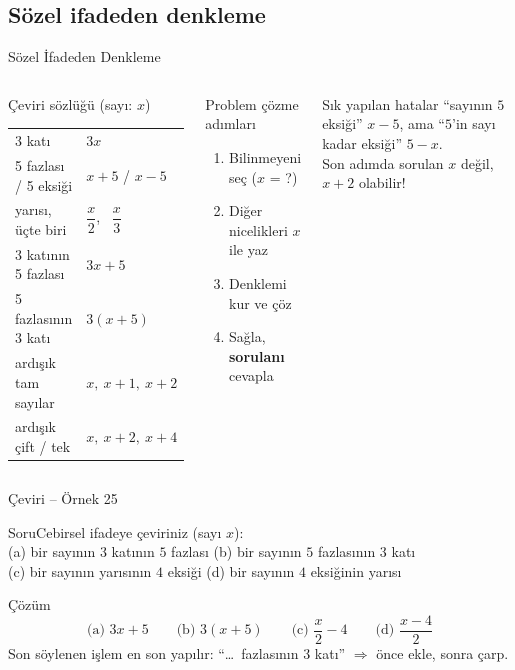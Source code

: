 \documentclass[aspectratio=169,11pt,handout]{beamer}
\newcommand{\soru}[3]{%
\begin{frame}{#1}
  \begin{block}{Soru}\large #2\end{block}
  \pause
  \begin{exampleblock}{Çözüm}\large #3\end{exampleblock}
\end{frame}}
\begin{document}
\subsection{Sözel ifadeden denkleme}
\begin{frame}{Sözel İfadeden Denkleme}
\begin{columns}[t]
\begin{block}{Çeviri sözlüğü (sayı: \(x\))}
\small
\begin{tabular}{@{}ll@{}}
3 katı & \(3x\)\\
5 fazlası / 5 eksiği & \(x+5\) / \(x-5\)\\
yarısı, üçte biri & \(\dfrac{x}{2}\), \ \(\dfrac{x}{3}\)\\[4pt]
3 katının 5 fazlası & \(3x+5\)\\
5 fazlasının 3 katı & \(3(x+5)\)\\
ardışık tam sayılar & \(x,\ x+1,\ x+2\)\\
ardışık çift / tek & \(x,\ x+2,\ x+4\)
\end{tabular}
\end{block}
\begin{block}{Problem çözme adımları}
\begin{enumerate}
\item Bilinmeyeni seç (\(x\) = ?)
\item Diğer nicelikleri \(x\) ile yaz
\item Denklemi kur ve çöz
\item Sağla, \textbf{sorulanı} cevapla
\end{enumerate}
\end{block}
\begin{alertblock}{Sık yapılan hatalar}
\small ``sayının \(5\) eksiği'' \(x-5\), ama ``\(5\)'in sayı kadar eksiği'' \(5-x\).\\
Son adımda sorulan \(x\) değil, \(x+2\) olabilir!
\end{alertblock}
\end{columns}
\end{frame}

\soru{Çeviri -- Örnek 25}
{Cebirsel ifadeye çeviriniz (sayı \(x\)):\\
(a) bir sayının \(3\) katının \(5\) fazlası \quad (b) bir sayının \(5\) fazlasının \(3\) katı\\
(c) bir sayının yarısının \(4\) eksiği \quad (d) bir sayının \(4\) eksiğinin yarısı}
{\[\text{(a) } 3x+5\qquad \text{(b) } 3(x+5)\qquad \text{(c) } \frac{x}{2}-4\qquad \text{(d) } \frac{x-4}{2}\]
Son söylenen işlem en son yapılır: ``\dots\ fazlasının \(3\) katı'' \(\Rightarrow\) önce ekle, sonra çarp.}
\end{document}
